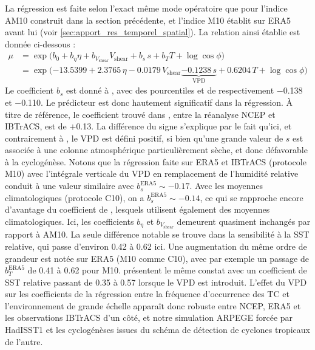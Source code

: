 \documentclass[../main.tex]{subfiles}
\begin{document}
La régression est faite selon l'exact même mode opératoire que pour l'indice AM10 construit dans la section précédente, et l'indice M10 établit sur ERA5 avant
lui (voir \cref{sec:apport_res_temporel_spatial}). La relation ainsi établie est donnée ci-dessous :
%
\begin{align*}
\tag{AVPD}
    \mu &= \exp \big( b_0 + b_\eta \eta + b_{V_{\mathrm{shear}}} V_{\mathrm{shear}} + b_{s} \, s + b_T T + \log \cos \phi \big)\\
        &= \exp \big( \num{-13.5399} + \num{2.3765} \, \eta - \num{0.0179} \, V_{\mathrm{shear}} \underbrace{- \num{0.1238} \, s}_{\mathrm{VPD}} + \num{0.6204} \, T + \log \cos \phi \big)
\end{align*}
%
Le coefficient $b_s$ est donné à , avec des pourcentiles  et  de respectivement \num{-0.138} et \num{-0.110}. Le
prédicteur est donc hautement significatif dans la régression. À titre de référence, le coefficient trouvé dans \textcite{camargo_testing_2014}, entre la
réanalyse NCEP et IBTrACS, est de $+$\num{0.13}. La différence du signe s'explique par le fait qu'ici, et contrairement à \textcite{camargo_testing_2014}, le
VPD est défini positif, si bien qu'une grande valeur de $s$ est associée à une colonne atmosphérique particulièrement sèche, et donc défavorable à la
cyclogénèse. Notons que la régression faite sur ERA5 et IBTrACS (protocole M10) avec l'intégrale verticale du VPD en remplacement de l'humidité relative conduit
à une valeur similaire avec $b_s^{\mathrm{ERA5}} \sim \num{-0.17}$. Avec les moyennes climatologiques (protocole C10), on a $b_s^{\mathrm{ERA5}} \sim
\num{-0.14}$, ce qui se rapproche encore d'avantage du coefficient de \textcite{camargo_testing_2014}, lesquels utilisent également des moyennes
climatologiques. Ici, les coefficients $b_\eta$ et $b_{V_{\mathrm{shear}}}$ demeurent quasiment inchangés par rapport à AM10. La seule différence notable se
trouve dans la sensibilité à la SST relative, qui passe d'environ \num{0.42} à \num{0.62} ici. Une augmentation du même ordre de grandeur est notée sur ERA5
(M10 comme C10), avec par exemple un passage de $b_T^{\mathrm{ERA5}}$ de \num{0.41} à \num{0.62} pour M10. \textcite{camargo_testing_2014} présentent le même
constat avec un coefficient de SST relative passant de \num{0.35} à \num{0.57} lorsque le VPD est introduit. L'effet du VPD sur les coefficients de la
régression entre la fréquence d'occurrence des TC et l'environnement de grande échelle apparaît donc robuste entre NCEP, ERA5 et les observations IBTrACS d'un
côté, et notre simulation ARPEGE forcée par HadISST1 et les cyclogénèses issues du schéma de détection de cyclones tropicaux de l'autre.
\end{document}
